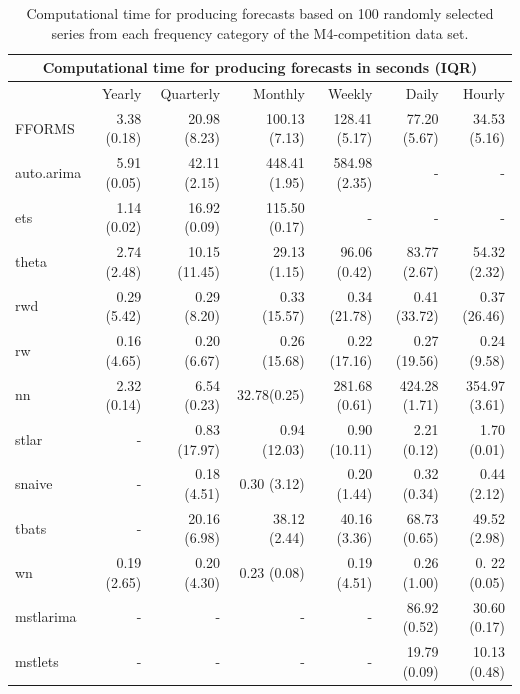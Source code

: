 \documentclass[11pt,a4paper,]{article}
\begin{document}
\begin{table}[!h]
    \centering\scriptsize\tabcolsep=0.12cm
    \caption{Computational time for producing forecasts based on 100 randomly selected series from each frequency category of the M4-competition data set.}
    \label{forecasttime}
    \begin{tabular}{lrrrrrr}
        \toprule
        \multicolumn{7}{c}{Computational time for producing forecasts in seconds (IQR)}                                 \\
    \midrule
                          & Yearly      & Quarterly     & Monthly       & Weekly        & Daily         & Hourly        \\
    \midrule
        FFORMS & 3.38 (0.18) & 20.98 (8.23)  & 100.13 (7.13) & 128.41 (5.17) & 77.20 (5.67)  & 34.53 (5.16)  \\
        auto.arima        & 5.91 (0.05) & 42.11 (2.15)  & 448.41 (1.95) & 584.98 (2.35) & -             & -             \\
        ets               & 1.14 (0.02) & 16.92 (0.09)  & 115.50 (0.17) & -             & -             & -             \\
        theta             & 2.74 (2.48) & 10.15 (11.45) & 29.13 (1.15)  & 96.06 (0.42)  & 83.77 (2.67)  & 54.32 (2.32)  \\
        rwd               & 0.29 (5.42) & 0.29 (8.20)   & 0.33 (15.57)  & 0.34 (21.78)  & 0.41 (33.72)  & 0.37 (26.46)  \\
        rw                & 0.16 (4.65) & 0.20 (6.67)   & 0.26 (15.68)  & 0.22 (17.16)  & 0.27 (19.56)  & 0.24 (9.58)   \\
        nn                & 2.32 (0.14) & 6.54 (0.23)   & 32.78(0.25)   & 281.68 (0.61) & 424.28 (1.71) & 354.97 (3.61) \\
        stlar             & -           & 0.83 (17.97)  & 0.94 (12.03)  & 0.90 (10.11)  & 2.21 (0.12)   & 1.70 (0.01)   \\
        snaive            & -           & 0.18 (4.51)   & 0.30 (3.12)   & 0.20 (1.44)   & 0.32 (0.34)   & 0.44 (2.12)   \\
        tbats             & -           & 20.16 (6.98)  & 38.12 (2.44)  & 40.16 (3.36)  & 68.73 (0.65)  & 49.52 (2.98)  \\
        wn                & 0.19 (2.65) & 0.20 (4.30)   & 0.23 (0.08)   & 0.19 (4.51)   & 0.26 (1.00)   & 0. 22 (0.05)  \\
        mstlarima         & -           & -             & -             & -             & 86.92 (0.52)  & 30.60 (0.17)  \\
        mstlets           & -           & -             & -             & -             & 19.79 (0.09)  & 10.13 (0.48)  \\
    \bottomrule
    \end{tabular}
\end{table}
\end{document}
